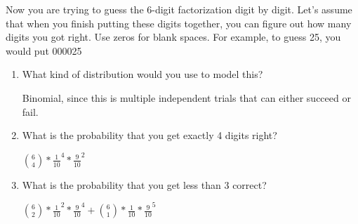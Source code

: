\question Now you are trying to guess the 6-digit factorization digit 
by digit. Let’s assume that when you finish putting these digits together, 
you can figure out how many digits you got right. Use zeros for blank 
spaces. For example, to guess 25, you would put 000025

\begin{enumerate}[label=(\alph*)]
\item What kind of distribution would you use to model this?
\begin{solution}[1cm]
Binomial, since this is multiple independent trials that can either 
succeed or fail.
\end{solution}

\item What is the probability that you get exactly 4 digits right?
\begin{solution}[2cm]
${6 \choose 4} * \frac{1}{10}^4 * \frac{9}{10}^2$
\end{solution}		

\item What is the probability that you get less than 3 correct?
\begin{solution}[1cm]
${6 \choose 2} * \frac{1}{10}^2 * \frac{9}{10}^4 + {6 \choose 1} * 
\frac{1}{10} * \frac{9}{10}^5$
		\end{solution}
\end{enumerate}